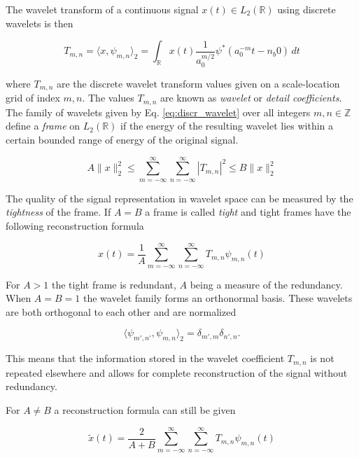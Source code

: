 The wavelet transform of a continuous signal $x(t) \in L_2(\mathbb{R})$ using discrete wavelets is then

\begin{equation}
    T_{m,n} = \langle x, \psi_{m, n}\rangle_2 = \int_{\mathbb{R}} x(t) \frac{1}{a_0^{m/2}} \psi^{\ast}(a_0^{-m}t - n_b0) \,dt
\end{equation}

where $T_{m, n}$ are the discrete wavelet transform values given on a scale-location grid of index $m,n$. The values $T_{m,n}$ are known as \textit{wavelet} 
or \textit{detail coefficients}. The family of wavelets given by Eq. \ref{eq:discr_wavelet} over all integers $m, n \in \mathbb{Z}$ define a \textit{frame} on 
$L_2(\mathbb{R})$ if the energy of the resulting wavelet lies within a certain bounded range of energy of the original signal.

\begin{equation}
    A \|x\|_2^2 \leq \sum_{m=-\infty}^{\infty} \sum_{n=-\infty}^{\infty} |T_{m,n}|^2 \leq B \|x\|_2^2
\end{equation}

The quality of the signal representation in wavelet space can be measured by the \textit{tightness} of the frame. If $A=B$ a frame is called \textit{tight} and 
tight frames have the following reconstruction formula 

\begin{equation}
    x(t) = \frac{1}{A} \sum_{m=-\infty}^{\infty} \sum_{n=-\infty}^{\infty} T_{m, n} \psi_{m, n} (t)
\end{equation}

For $A>1$ the tight frame is redundant, $A$ being a measure of the redundancy. When $A=B=1$ the wavelet family forms an orthonormal basis. These wavelets are both
orthogonal to each other and are normalized

\begin{equation}
    \langle \psi_{m', n'}, \psi_{m, n}\rangle_2 = \delta_{m', m} \delta_{n', n}.
\end{equation}

This means that the information stored in the wavelet coefficient $T_{m, n}$ is not repeated elsewhere and allows for complete reconstruction of the signal without
redundancy.

For $A \neq B$ a reconstruction formula can still be given

\begin{equation}
    \tilde{x}(t) = \frac{2}{A+B} \sum_{m=-\infty}^{\infty} \sum_{n=-\infty}^{\infty} T_{m, n} \psi_{m, n} (t)
\end{equation}

